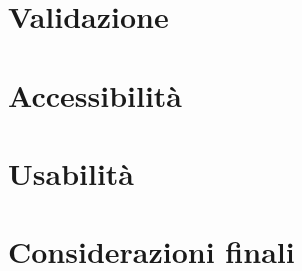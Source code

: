 \documentclass[12pt, a4paper]{article}
\begin{document}
\section{Validazione}

\section{Accessibilità}

\section{Usabilità}

\section{Considerazioni finali}
\end{document}
